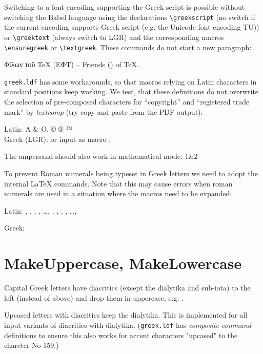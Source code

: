 \documentclass[a4paper]{article}
\begin{document}
Switching to a font encoding supporting the Greek script is possible without
switching the Babel language using the declarations \verb|\greekscript| (no
switch if the current encoding supports Greek script (e.g. the Unicode font
encoding TU)) or \verb|\greektext| (always switch to LGR) and the
corresponding macros \verb|\ensuregreek| or \verb|\textgreek|. These
commands do not start a new paragraph:

\greekscript Φίλων τοῦ \textlatin{TeX} (ΕΦΤ) --
\latintext Friends () of TeX.

\texttt{greek.ldf} has some workarounds, so that macros relying on Latin
characters in standard positions keep working. We test, that these
definitions do not overwrite the selection of pre-composed characters for
``copyright'' and ``registered trade mark'' by \emph{textcomp} (try copy and
paste from the PDF output):

Latin: A \& O, © ® ™ \\
Greek (LGR): 
or input as macro \ensuregreek{\textAlpha{} \textampersand{} \textOmega{},
\textcopyright{} \textregistered{} \texttrademark{}}.

The ampersand should also work in mathematical mode: $ 1 \& 2 $

To prevent Roman numerals being typeset in Greek letters we need to adopt
the internal LaTeX commands. Note that this may cause errors when roman
numerals are used in a situation where the macros need to be expanded:

\makeatletter
Latin:
, , , , \ldots, 
, , , , \ldots, 

Greek: 
\makeatother

\section{MakeUppercase, MakeLowercase}

Capital Greek letters have diacritics (except the dialytika and sub-iota) to
the left (instead of above) and drop them in uppercase, e.g.
.

Upcased letters with diacritics keep the dialytika. This is implemented for
all input variants of diacritics with dialytika. (\texttt{greek.ldf} has
\emph{composite command} definitions to ensure this also works for accent
characters "upcased" to the charcter No 159.)
\end{document}
